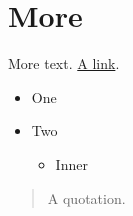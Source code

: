 \documentclass{article}\usepackage[utf8]{inputenc}\usepackage[T1]{fontenc}\usepackage{lmodern}\usepackage{amsmath,amssymb,amsthm,graphicx,xcolor,booktabs,longtable,geometry}\usepackage{tcolorbox}\usepackage{thmtools}\usepackage{natbib}\usepackage{bibentry}\usepackage{caption}\usepackage{subcaption}\usepackage[export]{adjustbox}\usepackage{soul}\usepackage{setspace}\usepackage{multirow}\usepackage{fancyhdr}\usepackage{csquotes}\usepackage{float}\usepackage{fvextra}\usepackage{imakeidx}\usepackage{sgame}\usepackage{tikz}\usepackage{attachfile2}\usepackage{hyperref}\usepackage{cleveref}
\begin{document}
\section{More}\label{sec:more}
More text. \href{https://example.org}{A link}.
\begin{itemize}\item One\item Two\begin{itemize}\item Inner\end{itemize}\end{itemize}
\begin{quote}A quotation.\end{quote}
\nocite{*}


\printindex
\end{document}
